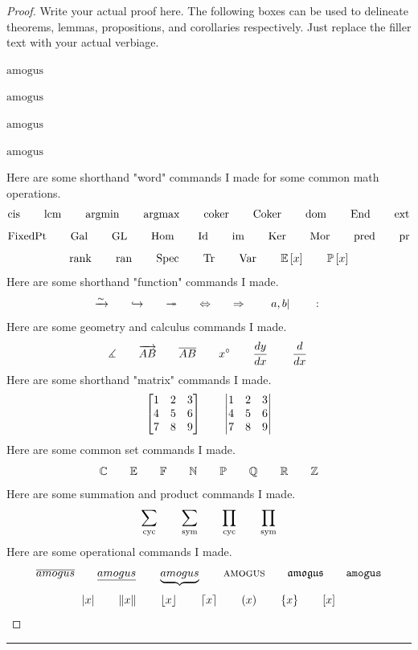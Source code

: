 \documentclass[conference]{styles/acmsiggraph}
\newenvironment{answer}{}{}
\begin{document}
\begin{answer}
	\begin{proof} 
	Write your actual proof here. The following boxes can be used to delineate theorems, lemmas, propositions, and corollaries respectively. Just replace the filler text with your actual verbiage. 
	\begin{Theorem}
	$\text{amogus}$
	\end{Theorem}
	\begin{Lemma}
	$\text{amogus}$
	\end{Lemma}
	\begin{Proposition}
	$\text{amogus}$
	\end{Proposition}
	\begin{Corollary}
	$\text{amogus}$
	\end{Corollary}
	Here are some shorthand "word" commands I made for some common math operations.
	$$\operatorname{cis} \qquad \operatorname*{lcm} \qquad \operatorname*{arg min} \qquad \operatorname*{arg max} \qquad \operatorname{coker} \qquad \operatorname{Coker} \qquad \operatorname{dom} \qquad \operatorname{End} \qquad \operatorname{ext}$$
	$$\operatorname{FixedPt} \qquad \operatorname{Gal} \qquad \operatorname{GL} \qquad \operatorname{Hom} \qquad \operatorname{Id} \qquad \operatorname{im} \qquad \operatorname{Ker} \qquad \operatorname{Mor} \qquad \operatorname{pred} \qquad \operatorname{pr}$$
	$$\operatorname{rank} \qquad \operatorname{ran} \qquad \operatorname{Spec} \qquad \operatorname{Tr} \qquad \operatorname{Var} \qquad \mathbb E\left[ x \right] \qquad \mathbb P\left[ x \right]$$
	Here are some shorthand "function" commands I made.
	$$\xrightarrow{\sim} \qquad \hookrightarrow \qquad \twoheadrightarrow \qquad \Leftrightarrow \qquad \Rightarrow \qquad \left.a,b\right|_{\qquad} \colon$$
	Here are some geometry and calculus commands I made.
	$$\measuredangle \qquad \overrightarrow{AB} \qquad \overline{AB} \qquad x^\circ \qquad \frac{dy}{dx}\, \qquad \frac{d}{dx}\,$$
	Here are some shorthand "matrix" commands I made.
	$$\begin{bmatrix}1 & 2 & 3 \\ 4 & 5 & 6 \\ 7 & 8 & 9\end{bmatrix} \qquad \begin{vmatrix}1 & 2 & 3 \\ 4 & 5 & 6 \\ 7 & 8 & 9\end{vmatrix}$$
	Here are some common set commands I made. 
	$$\mathbb C \qquad \mathbb E \qquad \mathbb F \qquad \mathbb N \qquad \mathbb P \qquad \mathbb Q \qquad \mathbb R \qquad \mathbb Z$$
	Here are some summation and product commands I made.
	$$\sum_{\mathrm{cyc}} \qquad \sum_{\mathrm{sym}} \qquad \prod_{\mathrm{cyc}} \qquad \prod_{\mathrm{sym}}$$
	Here are some operational commands I made.
	$$\overline{amogus} \qquad \underline{amogus} \qquad \underbrace{amogus} \qquad \textsc{amogus} \qquad \mathfrak{amogus} \qquad \mbox{\texttt{amogus}}$$
	$$\left\lvert x \right\rvert \qquad \left\lVert x \right\rVert \qquad \left\lfloor x \right\rfloor \qquad \left\lceil x \right\rceil \qquad \left( x \right) \qquad \left\{ x \right\} \qquad \left[ x \right]$$
	\qedhere
    \end{proof}
\rule{\textwidth}{0.4pt}
\end{answer}
\end{document}
